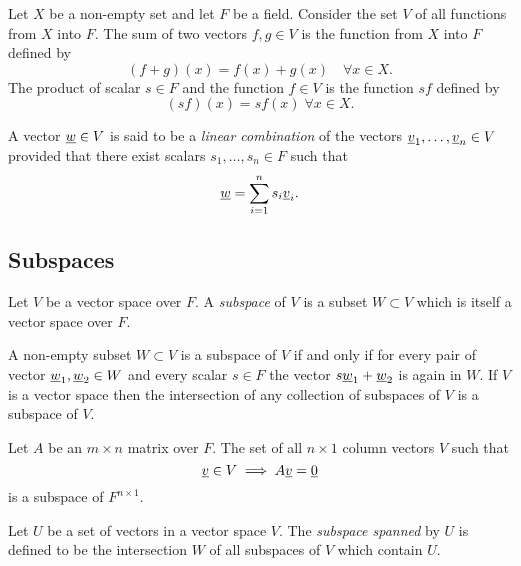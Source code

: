 \begin{example}
Let $X$ be a non-empty set and let $F$ be a field.
Consider the set $V$ of all functions from $X$ into $F$.
The sum of two vectors $f,g \in V$ is the function from $X$ into $F$ defined by
\begin{equation*}
(f + g)(x) = f(x) + g(x) \quad \forall x \in X.
\end{equation*}
The product of scalar $s \in F$ and the function $f \in V$ is the function $sf$ defined by
\begin{equation*}
(sf)(x) = s f(x) \; \forall x \in X.
\end{equation*}
\end{example}

\begin{definition}
A vector $\underline{w} \in V$ is said to be a \emph{linear combination} of the vectors $\underline{v}_1, \ldots, \underline{v}_n \in V$ provided that there exist scalars $s_1, \ldots, s_n \in F$ such that
\begin{equation*}
\underline{w} = \sum_{i=1}^n s_i \underline{v}_i.
\end{equation*}
\end{definition}


\subsection{Subspaces}

\begin{definition}
Let $V$ be a vector space over $F$.
A \emph{subspace} of $V$ is a subset $W \subset V$ which is itself a vector space over $F$.
\end{definition}

A non-empty subset $W \subset V$ is a subspace of $V$ if and only if for every pair of vector $\underline{w}_1, \underline{w}_2 \in W$ and every scalar $s \in F$ the vector $s \underline{w}_1 + \underline{w}_2$ is again in $W$.
If $V$ is a vector space then the intersection of any collection of subspaces of $V$ is a subspace of $V$.

\begin{example}
Let $A$ be an $m \times n$ matrix over $F$.
The set of all $n \times 1$ column vectors $V$ such that
\begin{equation*}
\underline{v} \in V \implies A \underline{v} = \underline{0}
\end{equation*}
is a subspace of $F^{n \times 1}$.
\end{example}

\begin{definition}
Let $U$ be a set of vectors in a vector space $V$.
The \emph{subspace spanned} by $U$ is defined to be the intersection $W$ of all subspaces of $V$ which contain $U$.
\end{definition}

